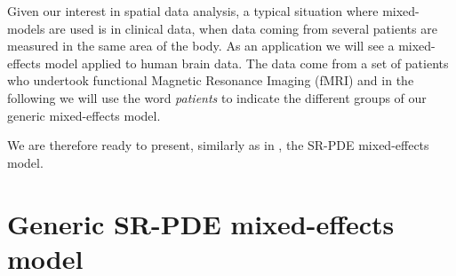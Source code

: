 Given our interest in spatial data analysis, a typical situation where
mixed-models are used is in clinical data, when data coming from several
patients are measured in the same area of the body. As an application we will
see a mixed-effects model applied to human brain data. The data come from a set
of patients who undertook functional Magnetic Resonance Imaging (fMRI) and in
the following we will use the word \textit{patients} to indicate the different
groups of our generic mixed-effects model.

We are therefore ready to present, similarly as in \cite{kim}, the SR-PDE
mixed-effects model.

\section{Generic SR-PDE mixed-effects model}

